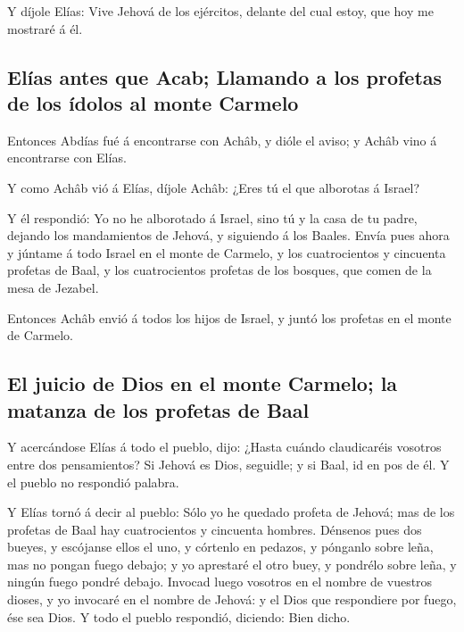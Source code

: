  Y díjole Elías: Vive Jehová de los ejércitos, delante
del cual estoy, que hoy me mostraré á él.

\hypertarget{eluxedas-antes-que-acab-llamando-a-los-profetas-de-los-uxeddolos-al-monte-carmelo}{%
\subsection{Elías antes que Acab; Llamando a los profetas de los ídolos
al monte
Carmelo}\label{eluxedas-antes-que-acab-llamando-a-los-profetas-de-los-uxeddolos-al-monte-carmelo}}

 Entonces Abdías fué á encontrarse con Achâb, y dióle el
aviso; y Achâb vino á encontrarse con Elías.

 Y como Achâb vió á Elías, díjole Achâb: ¿Eres tú el que
alborotas á Israel?

 Y él respondió: Yo no he alborotado á Israel, sino tú y
la casa de tu padre, dejando los mandamientos de Jehová, y siguiendo á
los Baales.  Envía pues ahora y júntame á todo Israel en
el monte de Carmelo, y los cuatrocientos y cincuenta profetas de Baal, y
los cuatrocientos profetas de los bosques, que comen de la mesa de
Jezabel.

 Entonces Achâb envió á todos los hijos de Israel, y
juntó los profetas en el monte de Carmelo.

\hypertarget{el-juicio-de-dios-en-el-monte-carmelo-la-matanza-de-los-profetas-de-baal}{%
\subsection{El juicio de Dios en el monte Carmelo; la matanza de los
profetas de
Baal}\label{el-juicio-de-dios-en-el-monte-carmelo-la-matanza-de-los-profetas-de-baal}}

 Y acercándose Elías á todo el pueblo, dijo: ¿Hasta
cuándo claudicaréis vosotros entre dos pensamientos? Si Jehová es Dios,
seguidle; y si Baal, id en pos de él. Y el pueblo no respondió palabra.

 Y Elías tornó á decir al pueblo: Sólo yo he quedado
profeta de Jehová; mas de los profetas de Baal hay cuatrocientos y
cincuenta hombres.  Dénsenos pues dos bueyes, y escójanse
ellos el uno, y córtenlo en pedazos, y pónganlo sobre leña, mas no
pongan fuego debajo; y yo aprestaré el otro buey, y pondrélo sobre leña,
y ningún fuego pondré debajo.  Invocad luego vosotros en
el nombre de vuestros dioses, y yo invocaré en el nombre de Jehová: y el
Dios que respondiere por fuego, ése sea Dios. Y todo el pueblo
respondió, diciendo: Bien dicho.

